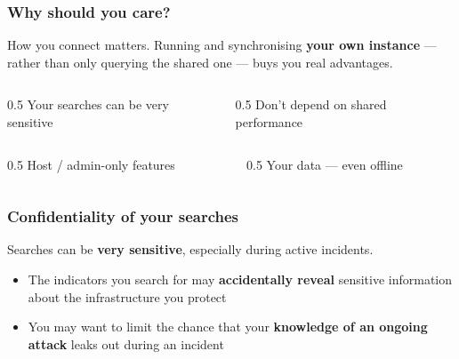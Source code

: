 \begin{frame}
    \frametitle{Why should you care?}

    How you connect matters. Running and synchronising \textbf{your own instance} ---
    rather than only querying the shared one --- buys you real advantages.

    \vspace{0.5em}

    \begin{center}
        \begin{columns}[T]
            \begin{column}{0.5\textwidth}
                    {Your searches can be very sensitive}
            \end{column}
            \hfill
            \begin{column}{0.5\textwidth}
                    {Don't depend on shared performance}
            \end{column}
        \end{columns}
        \begin{columns}[T]
            \begin{column}{0.5\textwidth}
                    {Host / admin-only features}
            \end{column}
            \hfill
            \begin{column}{0.5\textwidth}
                    {Your data --- even offline}
            \end{column}
        \end{columns}
    \end{center}
\end{frame}


\begin{frame}
    \frametitle{Confidentiality of your searches}

    Searches can be \textbf{very sensitive}, especially during active incidents.

    \vspace{0.5em}

    \begin{itemize}
        \item The indicators you search for may \textbf{accidentally reveal} sensitive
              information about the infrastructure you protect
        \item You may want to limit the chance that your \textbf{knowledge of an ongoing
              attack} leaks out during an incident
    \end{itemize}

    \vspace{0.5em}

\end{frame}



